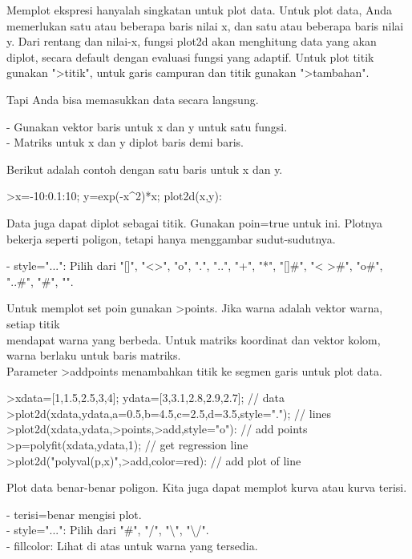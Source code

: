 \documentclass[a4paper,10pt]{article}
\begin{document}
\begin{eulernotebook}
\begin{eulercomment}
\begin{eulercomment}
\begin{eulercomment}
\begin{eulercomment}
\begin{eulercomment}
\begin{eulercomment}
\begin{eulercomment}
Memplot ekspresi hanyalah singkatan untuk plot data. Untuk plot data,
Anda memerlukan satu atau beberapa baris nilai x, dan satu atau
beberapa baris nilai y. Dari rentang dan nilai-x, fungsi plot2d akan
menghitung data yang akan diplot, secara default dengan evaluasi
fungsi yang adaptif. Untuk plot titik gunakan "\textgreater{}titik", untuk garis
campuran dan titik gunakan "\textgreater{}tambahan".

Tapi Anda bisa memasukkan data secara langsung.

- Gunakan vektor baris untuk x dan y untuk satu fungsi.\\
- Matriks untuk x dan y diplot baris demi baris.

Berikut adalah contoh dengan satu baris untuk x dan y.
\end{eulercomment}
\begin{eulerprompt}
>x=-10:0.1:10; y=exp(-x^2)*x; plot2d(x,y):
\end{eulerprompt}
\begin{eulercomment}
Data juga dapat diplot sebagai titik. Gunakan poin=true untuk ini.
Plotnya bekerja seperti poligon, tetapi hanya menggambar
sudut-sudutnya.

- style="...": Pilih dari "[]", "\textless{}\textgreater{}", "o", ".", "..", "+", "*", "[]#",
"\textless{} \textgreater{}#", "o#", "..#", "#", "\textbar{}".

Untuk memplot set poin gunakan \textgreater{}points. Jika warna adalah vektor
warna, setiap titik\\
mendapat warna yang berbeda. Untuk matriks koordinat dan vektor kolom,
warna berlaku untuk baris matriks.\\
Parameter \textgreater{}addpoints menambahkan titik ke segmen garis untuk plot
data.
\end{eulercomment}
\begin{eulerprompt}
>xdata=[1,1.5,2.5,3,4]; ydata=[3,3.1,2.8,2.9,2.7]; // data
>plot2d(xdata,ydata,a=0.5,b=4.5,c=2.5,d=3.5,style="."); // lines
>plot2d(xdata,ydata,>points,>add,style="o"): // add points
>p=polyfit(xdata,ydata,1); // get regression line
>plot2d("polyval(p,x)",>add,color=red): // add plot of line
\end{eulerprompt}
\begin{eulercomment}
Plot data benar-benar poligon. Kita juga dapat memplot kurva atau
kurva terisi.

- terisi=benar mengisi plot.\\
- style="...": Pilih dari "#", "/", "\textbackslash{}", "\textbackslash{}/".\\
- fillcolor: Lihat di atas untuk warna yang tersedia.


\end{eulercomment}
\end{eulercomment}
\end{eulercomment}
\end{eulercomment}
\end{eulercomment}
\end{eulercomment}
\end{eulercomment}
\end{eulernotebook}
\end{document}
